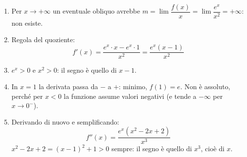 \begin{question}[ID=2.4, subtitle={Studio completo di una funzione esponenziale fratta}, difficulty=difficile, tags={funzioni, studio di funzione, esponenziali}]
\begin{explanation}
\begin{enumerate}
    \item Per $x\to+\infty$ un eventuale obliquo avrebbe $m=\lim\dfrac{f(x)}{x}=\lim\dfrac{e^x}{x^2}=+\infty$: non esiste.
    \item Regola del quoziente:
    \[ f'(x)=\dfrac{e^x\cdot x-e^x\cdot1}{x^2}=\dfrac{e^x(x-1)}{x^2} \]
    \item $e^x>0$ e $x^2>0$: il segno è quello di $x-1$.
    \item In $x=1$ la derivata passa da $-$ a $+$: minimo, $f(1)=e$. Non è assoluto, perché per $x<0$ la funzione assume valori negativi (e tende a $-\infty$ per $x\to0^-$).
    \item Derivando di nuovo e semplificando:
    \[ f''(x)=\dfrac{e^x(x^2-2x+2)}{x^3} \]
    $x^2-2x+2=(x-1)^2+1>0$ sempre: il segno è quello di $x^3$, cioè di $x$.
\end{enumerate}
\end{explanation}
\end{question}



